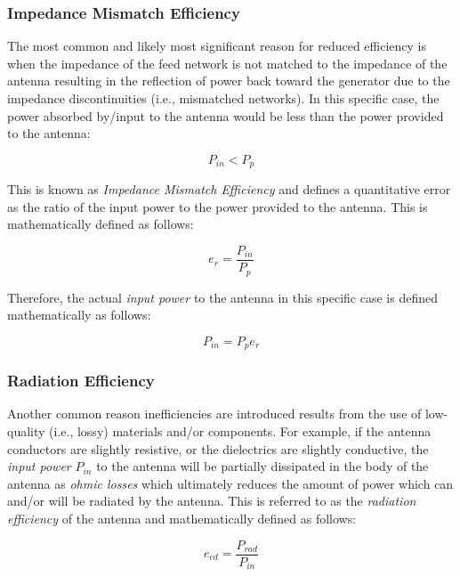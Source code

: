 \documentclass{article}
\begin{document}
\subsubsection{Impedance Mismatch Efficiency}
The most common and likely most significant reason for reduced efficiency is when the impedance of the feed network is not matched to the impedance of the antenna resulting in the reflection of power back toward the generator due to the impedance discontinuities (i.e., mismatched networks). In this specific case, the power absorbed by/input to the antenna would be less than the power provided to the antenna:

\begin{equation*}
    P_{in} < P_p
\end{equation*}

This is known as \textit{Impedance Mismatch Efficiency} and defines a quantitative error as the ratio of the input power to the power provided to the antenna. This is mathematically defined as follows:

\begin{equation}\label{mismatchEfficiency}
    e_r = \dfrac{P_{in}}{P_p}
\end{equation}

Therefore, the actual \textit{input power} to the antenna in this specific case is defined mathematically as follows:

\begin{equation*}
    P_{in} = P_p e_r
\end{equation*}

\subsubsection{Radiation Efficiency}
Another common reason inefficiencies are introduced results from the use of low-quality (i.e., lossy) materials and/or components. For example, if the antenna conductors are slightly resistive, or the dielectrics are slightly conductive, the \textit{input power} $P_{in}$ to the antenna will be partially dissipated in the body of the antenna as \textit{ohmic losses} which ultimately reduces the amount of power which can and/or will be radiated by the antenna. This is referred to as the \textit{radiation efficiency} of the antenna and mathematically defined as follows:

\begin{equation}\label{radiationEfficiency}
    e_{cd} = \dfrac{P_{rad}}{P_{in}}
\end{equation}
\end{document}
